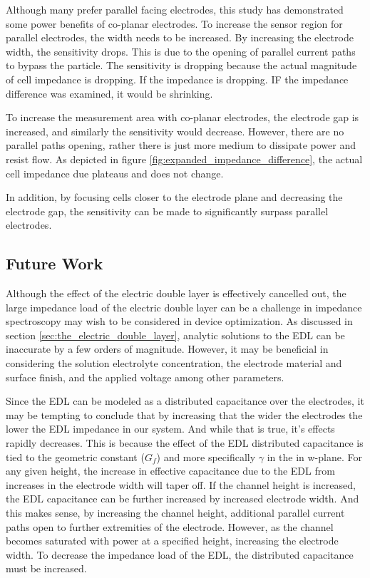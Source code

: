 \par Although many prefer parallel facing electrodes, this study has demonstrated some power benefits of co-planar electrodes. To increase the sensor region for parallel electrodes, the width needs to be increased. By increasing the electrode width, the sensitivity drops. This is due to the opening of parallel current paths to bypass the particle. The sensitivity is dropping because the actual magnitude of cell impedance is dropping. If the impedance is dropping. IF the impedance difference was examined, it would be shrinking.

\par To increase the measurement area with co-planar electrodes, the electrode gap is increased, and similarly the sensitivity would decrease. However, there are no parallel paths opening, rather there is just more medium to dissipate power and resist flow. As depicted in figure \ref{fig:expanded_impedance_difference}, the actual cell impedance due plateaus and does not change.

\par In addition, by focusing cells closer to the electrode plane and decreasing the electrode gap, the sensitivity can be made to significantly surpass parallel electrodes.

\subsection*{Future Work}

\par Although the effect of the electric double layer is effectively cancelled out, the large impedance load of the electric double layer can be a challenge in impedance spectroscopy may wish to be considered in device optimization. As discussed in section \ref{sec:the_electric_double_layer}, analytic solutions to the EDL can be inaccurate by a few orders of magnitude. However, it may be beneficial in considering the solution electrolyte concentration, the electrode material and surface finish, and the applied voltage among other parameters. 

\par Since the EDL can be modeled as a distributed capacitance over the electrodes, it may be tempting to conclude that by increasing that the wider the electrodes the lower the EDL impedance in our system. And while that is true, it's effects rapidly decreases. This is because the effect of the EDL distributed capacitance is tied to the geometric constant ($G_f$) and more specifically $\gamma$ in the in w-plane. For any given height, the increase in effective capacitance due to the EDL from increases in the electrode width will taper off. If the channel height is increased, the EDL capacitance can be further increased by increased electrode width. And this makes sense, by increasing the channel height, additional parallel current paths open to further extremities of the electrode. However, as the channel becomes saturated with power at a specified height, increasing the electrode width. To decrease the impedance load of the EDL, the distributed capacitance must be increased. 

